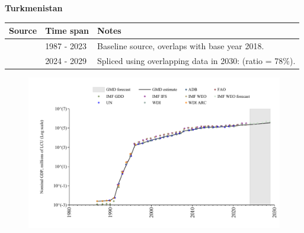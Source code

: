 \documentclass[12pt,a4paper,landscape]{article}
\begin{document}
\begin{adjustbox}{max totalsize={\paperwidth}{\paperheight},center}
\begin{minipage}[t][\textheight][t]{\textwidth}
\vspace*{0.5cm}
{}
\begin{center}
{\Large\bfseries Turkmenistan}
\end{center}
\vspace{0.5cm}
\begin{table}[H]
\centering
\small
\begin{tabular}{|l|l|l|}
\hline
\textbf{Source} & \textbf{Time span} & \textbf{Notes} \\
\hline
\rowcolor{white}\cite{WDI}& 1987 - 2023 &Baseline source, overlaps with base year 2018.\\
\rowcolor{lightgray}\cite{IMF_WEO_forecast}& 2024 - 2029 &Spliced using overlapping data in 2030: (ratio = 78\%).\\
\hline
\end{tabular}
\end{table}
\begin{figure}[H]
\centering
\includegraphics[width=\textwidth,height=0.6\textheight,keepaspectratio]{graphs/TKM_nGDP.pdf}
\end{figure}
\end{minipage}
\end{adjustbox}
\end{document}
